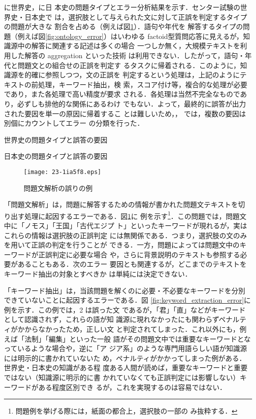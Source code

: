 \documentclass[japanese]{jnlp_1.4b}
\def\TABREF#1{}
\begin{document}
\TABREF{tab:sekaishi:errors}に世界史，\TABREF{tab:nihonshi:errors}に日
本史の問題タイプとエラー分析結果を示す．センター試験の世界史・日本史で
は，選択肢として与えられた文に対して正誤を判定するタイプの問題が大きな
割合を占める（例えば図\ref{fig:problem_analysis_error}）．語句や年代を
解答するタイプの問題（例えば図\ref{fig:ontology_error}）はいわゆる
factoid型質問応答に見えるが，知識源中の解答に関連する記述は多くの場合
一つしか無く，大規模テキストを利用した解答の aggregation といった技術
は利用できない．したがって，語句・年代と問題文との組合せの正誤を判定す
るタスクに帰着される．このように，知識源を的確に参照しつつ，文の正誤を
判定するという処理は，上記のようにテキストの前処理，キーワード抽出，検
索，スコア付け等，複合的な処理が必要であり，また各処理で高い精度が要求
される．各処理は当然不完全なものであり，必ずしも排他的な関係にあるわけ
でもない．よって，最終的に誤答が出力された要因を単一の原因に帰着するこ
とは難しいため，\TABREF{tab:sekaishi:errors}，
\TABREF{tab:nihonshi:errors}では，複数の要因は別個にカウントしてエラー
の分類を行った．

\begin{table}[t]
\caption{世界史の問題タイプと誤答の要因}
\label{tab:sekaishi:errors}

\end{table}
\begin{table}[t]
\caption{日本史の問題タイプと誤答の要因}
\label{tab:nihonshi:errors}

\end{table}
\begin{figure}[t]
\begin{center}
\texttt{[image: 23-1ia5f8.eps]}
\end{center}
\caption{問題文解析の誤りの例}
\label{fig:problem_analysis_error}
\end{figure}

「問題文解析」は，問題に解答するための情報が書かれた問題文テキストを切
り出す処理に起因するエラーである．図\ref{fig:problem_analysis_error}に
例を示す\footnote{問題例を挙げる際には，紙面の都合上，選択肢の一部の
  み抜粋する．}．この問題では，問題文中に「ノモス」「王国」「古代エジプ
  ト」といったキーワードが現れるが，実はこれらの情報は選択肢の正誤判定
には無関係である．つまり，選択肢の文のみを用いて正誤の判定を行うことが
できる．一方，問題によっては問題文中のキーワードが正誤判定に必要な場合
や，さらに背景説明のテキストも参照する必要があることもある．次のエラー
要因とも関連するが，どこまでのテキストをキーワード抽出の対象とすべきか
は単純には決定できない．

「キーワード抽出」は，当該問題を解くのに必要・不必要なキーワードを分別
できていないことに起因するエラーである．図
\ref{fig:keyword_extraction_error}に例を示す．この例では，2 は誤った文
であるが，「君」「直」などがキーワードとして認識されず，これらの語が知
識源に現れなかったにも関わらずペナルティがかからなかったため，正しい文
と判定されてしまった．これ以外にも，例えば「法制」「編集」といった一般
語がその問題文中では重要なキーワードとなっているような場合や，逆に「ア
  ジア系」のような専門用語らしい語が知識源には明示的に書かれていないた
め，ペナルティがかかってしまった例がある．世界史・日本史の知識がある程
度ある人間が読めば，重要なキーワードと重要ではない（知識源に明示的に書
  かれていなくても正誤判定には影響しない）キーワードがある程度区別でき
るが，これを実現するのは容易ではない．
\end{document}

